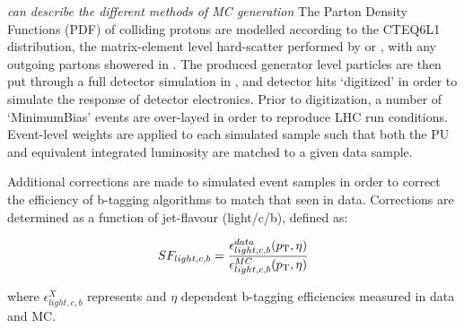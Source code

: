 \emph{can describe the different methods of MC generation}
The Parton Density Functions (PDF) of colliding protons are modelled according
to the
CTEQ6L1 distribution, the matrix-element level hard-scatter performed by
\MADGRAPH or \PYTHIA, with any outgoing partons showered in \PYTHIA. The
produced generator level particles are then put through a full detector
simulation in \GEANT, and detector hits `digitized' in order to simulate the
response of detector electronics. Prior to digitization, a number of
`MinimumBias' events are
over-layed in order to reproduce LHC run conditions. Event-level weights
are applied to each simulated sample such that both the PU and equivalent
integrated luminosity are matched to a given data sample.

Additional corrections are made to simulated event samples in order to correct
the efficiency of b-tagging algorithms to match that seen in data. Corrections
are determined as a function of jet-flavour (light/c/b), defined as:

\begin{equation}
SF_{light,c,b} = \frac{\epsilon^{data}_{light,c,b}({p_{\text T}}, \eta)}{\epsilon^
{MC}_ {light,c,b}({p_{\text T}}, \eta)}
\end{equation}

where $\epsilon^{X}_{light, c, b}$ represents \Pt and $\eta$ dependent
b-tagging efficiencies measured in data and MC.

